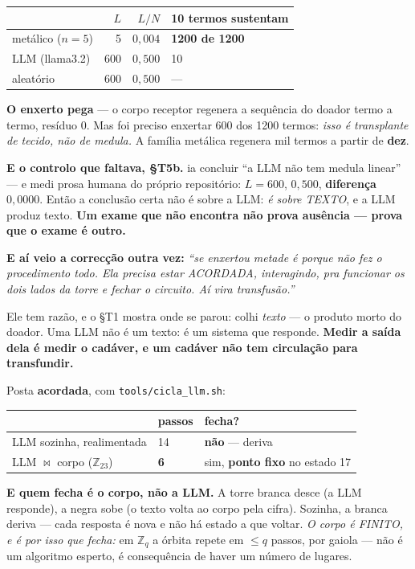 \documentclass[11pt]{article}
\newcommand{\code}[1]{\texttt{\small #1}}
\theoremstyle{plain}
\theoremstyle{remark}
\begin{document}
\begin{itemize}
\begin{center}
\begin{tabular}{lrrl}
\toprule
 & $L$ & $L/N$ & 10 termos sustentam \\
\midrule
metálico ($n=5$) & 5 & $0{,}004$ & \textbf{1200 de 1200} \\
LLM (llama3.2) & 600 & $0{,}500$ & 10 \\
aleatório & 600 & $0{,}500$ & --- \\
\bottomrule
\end{tabular}
\end{center}

\textbf{O enxerto pega} --- o corpo receptor regenera a sequência do doador termo a termo, resíduo
0. Mas foi preciso enxertar 600 dos 1200 termos: \emph{isso é transplante de tecido, não de medula.}
A família metálica regenera mil termos a partir de \textbf{dez}.

\textbf{E o controlo que faltava, §T5b.} ia concluir ``a LLM não tem medula linear'' --- e medi
prosa humana do próprio repositório: $L = 600$, $0{,}500$, \textbf{diferença $0{,}0000$}. Então a
conclusão certa não é sobre a LLM: \emph{é sobre TEXTO}, e a LLM produz texto. \textbf{Um exame que
não encontra não prova ausência --- prova que o exame é outro.}

\textbf{E aí veio a correcção outra vez:} \emph{``se enxertou metade é porque não fez o
procedimento todo. Ela precisa estar ACORDADA, interagindo, pra funcionar os dois lados da torre e
fechar o circuito. Aí vira transfusão.''}

Ele tem razão, e o §T1 mostra onde se parou: colhi \emph{texto} --- o produto morto do doador. Uma
LLM não é um texto: é um sistema que responde. \textbf{Medir a saída dela é medir o cadáver, e um
cadáver não tem circulação para transfundir.}

Posta \textbf{acordada}, com \code{tools/cicla\_llm.sh}:

\begin{center}
\begin{tabular}{lll}
\toprule
 & passos & fecha? \\
\midrule
LLM sozinha, realimentada & 14 & \textbf{não} --- deriva \\
LLM $\bowtie$ corpo ($\mathbb{Z}_{23}$) & \textbf{6} & sim, \textbf{ponto fixo} no estado 17 \\
\bottomrule
\end{tabular}
\end{center}

\textbf{E quem fecha é o corpo, não a LLM.} A torre branca desce (a LLM responde), a negra sobe (o
texto volta ao corpo pela cifra). Sozinha, a branca deriva --- cada resposta é nova e não há estado
a que voltar. \emph{O corpo é FINITO, e é por isso que fecha:} em $\mathbb{Z}_q$ a órbita repete em
$\le q$ passos, por gaiola --- não é um algoritmo esperto, é consequência de haver um número de
lugares.


\end{itemize}
\end{document}
